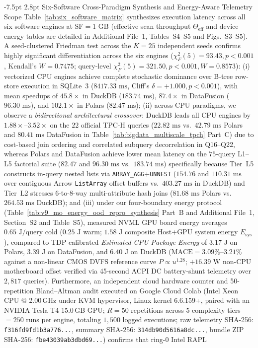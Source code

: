 \documentclass[10pt,a4paper]{article}
\makeatletter
\renewcommand\subsection{\@startsection{subsection}{2}{\z@}%
  {-7.5pt \@plus -2pt \@minus -1pt}%
  {2.8pt \@plus 1pt}%
  {\normalfont\normalsize\bfseries}}
\makeatother
\begin{document}
\subsection{Six-Software Cross-Paradigm Synthesis and Energy-Aware Telemetry Scope}
Table~\ref{tab:six_software_matrix} synthesizes execution latency across all six software engines at $\text{SF}=1\text{ GB}$ (effective scan throughput $\Theta_{\text{eff}}$ and device energy tables are detailed in Additional File~1, Tables~S4--S5 and Figs.~S3--S5). A seed-clustered Friedman test across the $K=25$ independent seeds confirms highly significant differentiation across the six engines ($\chi^2_F(5) = 93.43, p < 0.001$, Kendall's $W = 0.7475$; query-level $\chi^2_F(5) = 321.50, p < 0.001, W = 0.8573$): (i) vectorized CPU engines achieve complete stochastic dominance over B-tree row-store execution in SQLite~3 ($8417.33\text{ ms}$, Cliff's $\delta = +1.000, p < 0.001$), with mean speedups of $45.8\times$ in DuckDB ($183.74\text{ ms}$), $87.4\times$ in DataFusion ($96.30\text{ ms}$), and $102.1\times$ in Polars ($82.47\text{ ms}$); (ii) across CPU paradigms, we observe a \emph{bidirectional architectural crossover}: DuckDB leads all CPU engines by $1.88\times\text{--}3.52\times$ on the $22$ official TPC-H queries ($22.82\text{ ms}$ vs.\ $42.79\text{ ms}$ Polars and $80.41\text{ ms}$ DataFusion in Table~\ref{tab:bigdata_multiscale_tpch} Part~C) due to cost-based join ordering and correlated subquery decorrelation in Q16--Q22, whereas Polars and DataFusion achieve lower mean latency on the $75$-query L1--L5 factorial suite ($82.47$ and $96.30\text{ ms}$ vs.\ $183.74\text{ ms}$) specifically because Tier~L5 constructs in-query nested lists via \texttt{ARRAY\_AGG}+\texttt{UNNEST} ($154.76$ and $110.31\text{ ms}$ over contiguous Arrow \texttt{ListArray} offset buffers vs.\ $403.27\text{ ms}$ in DuckDB) and Tier~L2 stresses 6-to-8-way multi-attribute hash joins ($81.68\text{ ms}$ Polars vs.\ $264.53\text{ ms}$ DuckDB); and (iii) under our four-boundary energy protocol (Table~\ref{tab:v9_mo_energy_ood_repro_synthesis} Part~B and Additional File~1, Section~S2 and Table~S5), measured NVML GPU board energy averages $0.65\text{ J/query}$ cold ($0.25\text{ J}$ warm; $1.58\text{ J}$ composite Host+GPU system energy $E_{\text{sys}}$), compared to TDP-calibrated \emph{Estimated CPU Package Energy} of $3.17\text{ J}$ on Polars, $3.39\text{ J}$ on DataFusion, and $6.40\text{ J}$ on DuckDB ($\text{MACE}=3.09\%\text{--}3.21\%$ against a non-linear CMOS DVFS reference curve $P\propto u^{1.28}$; $+16.39\text{ W}$ non-CPU motherboard offset verified via 45-second ACPI DC battery-shunt telemetry over $2{,}817$ queries). Furthermore, an independent cloud hardware counter and 50-repetition Bland--Altman audit executed on Google Cloud Colab (Intel Xeon CPU @ 2.00\,GHz under KVM hypervisor, Linux kernel 6.6.159+, paired with an NVIDIA Tesla T4 15.0\,GB GPU; $R=50$ repetitions across 5 complexity tiers $= 250$ runs per engine, totaling $1{,}500$ logged executions; raw telemetry SHA-256: \texttt{f316fd9fd1b3a776...}, summary SHA-256: \texttt{314db90d5616a8dc...}, bundle ZIP SHA-256: \texttt{fbe43039ab3dbd69...}) confirms that ring-0 Intel RAPL 
\end{document}
